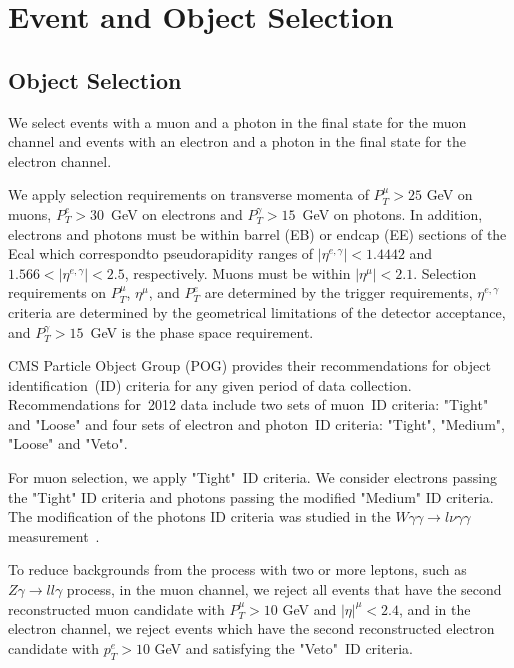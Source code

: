\section{Event and Object Selection}
\label{sec:AN_Selection}

\subsection{Object Selection}
\label{sec:AN_ObjectSelection}

We select events with a muon and a photon in the final state for the muon channel and events with an electron and a photon in the final state for the electron channel. 

We apply selection requirements on transverse momenta of $P_T^{\mu}>25$ GeV on muons,  $P_T^e>30$~GeV on electrons and $P_T^{\gamma}>15$~GeV on photons. In addition, electrons and photons must be within barrel (EB) or endcap (EE) sections of the Ecal which correspondto pseudorapidity ranges of $|\eta^{e,\gamma}| < 1.4442$ and $1.566 < |\eta^{e,\gamma}| < 2.5$, respectively. Muons must be within $|\eta^{\mu}|<2.1$. Selection requirements on $P_T^{\mu}$, $\eta^{\mu}$, and $P_T^e$ are determined by the trigger requirements, $\eta^{e,\gamma}$ criteria are determined by the geometrical limitations of the detector acceptance, and $P_T^{\gamma}>15$~GeV is the phase space requirement.

CMS Particle Object Group (POG) provides their recommendations for object identification~(ID) criteria for any given period of data collection. Recommendations for~2012 data include two sets of muon~ID criteria: "Tight" and "Loose" and four sets of electron and photon~ID criteria: "Tight", "Medium", "Loose" and "Veto".

For muon selection, we apply "Tight"~ID criteria. We consider electrons passing the "Tight" ID criteria and photons passing the modified "Medium" ID criteria. The modification of the photons ID criteria was studied in the $W\gamma\gamma \rightarrow l\nu\gamma\gamma$ measurement~\cite{ref_Wgg8TeV}.  %

To reduce backgrounds from the process with two or more leptons, such as $Z\gamma\rightarrow l l \gamma$ process, in the muon channel, we reject all events that have the second reconstructed muon candidate with $P_T^{\mu}>10$ GeV and $|\eta|^{\mu}<2.4$, and in the electron channel, we reject events which have the second reconstructed electron candidate with $p_T^e>10$ GeV and satisfying the "Veto"~ID criteria.

